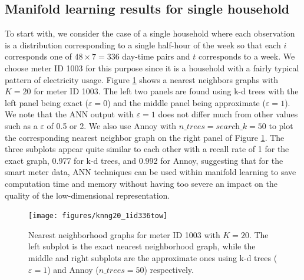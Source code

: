 \documentclass[12pt]{article}
\begin{document}
\hypertarget{electricityresults}{%
\subsection{Manifold learning results for single household}\label{electricityresults}}

To start with, we consider the case of a single household where each observation is a distribution corresponding to a single half-hour of the week so that each \(i\) corresponds one of \(48 \times 7 = 336\) day-time pairs and \(t\) corresponds to a week. We choose meter ID 1003 for this purpose since it is a household with a fairly typical pattern of electricity usage. Figure \ref{fig:neighborplot} shows a nearest neighbors graphs with \(K=20\) for meter ID 1003. The left two panels are found using k-d trees with the left panel being exact (\(\varepsilon = 0\)) and the middle panel being approximate (\(\varepsilon = 1\)).
We note that the ANN output with \(\varepsilon = 1\) does not differ much from other values such as a \(\varepsilon\) of 0.5 or 2. We also use Annoy with \(\textit{n\_trees}=\textit{search\_k}=50\) to plot the corresponding nearest neighbor graph on the right panel of Figure \ref{fig:neighborplot}.
The three subplots appear quite similar to each other with a recall rate of 1 for the exact graph, 0.977 for k-d trees, and 0.992 for Annoy, suggesting that for the smart meter data, ANN techniques can be used within manifold learning to save computation time and memory without having too severe an impact on the quality of the low-dimensional representation.

\begin{figure}

{\centering \texttt{[image: figures/knng20\_1id336tow]} 

}

\caption{Nearest neighborhood graphs for meter ID 1003 with $K=20$. The left subplot is the exact nearest neighborhood graph, while the middle and right subplots are the approximate ones using k-d trees ($\varepsilon = 1$) and Annoy ($\textit{n\_trees}=50$) respectively.}\label{fig:neighborplot}
\end{figure}
\end{document}
